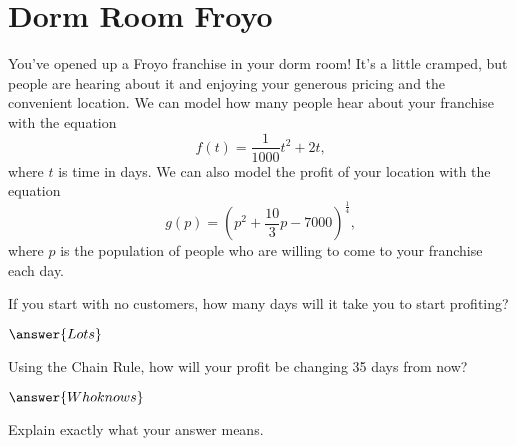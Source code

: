 \documentclass{ximera}
\begin{document}
\section{Dorm Room Froyo}
You've opened up a Froyo franchise in your dorm room! It's a little cramped, but people are hearing about it and enjoying your generous pricing and the convenient location. We can model how many people hear about your franchise with the equation $$f(t) = \frac{1}{1000}t^2 + 2t \text{,}$$ where $t$ is time in days. We can also model the profit of your location with the equation $$g(p) = (p^2 + \frac{10}{3}p - 7000)^{\frac{1}{4}} \text{,}$$ where $p$ is the population of people who are willing to come to your franchise each day.
\begin{question}
If you start with no customers, how many days will it take you to start profiting?

$\answer{Lots}$

Using the Chain Rule, how will your profit be changing 35 days from now?

$\answer{Who knows}$

Explain exactly what your answer means.
\begin{freeResponse}
\end{freeResponse}
\end{question}
\end{document}
